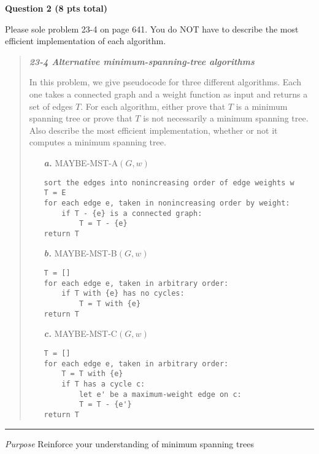\documentclass{article}
\newcommand\separator{\rule{\textwidth}{.2pt}}  %
\begin{document}
\begin{framed}
    \textbf{Question 2 (8 pts total)}
    
    Please sole problem 23-4 on page 641. You do NOT have to describe the most 
    efficient implementation of each algorithm.
    
    \begin{quote}
        \textbf{\textit{23-4 Alternative minimum-spanning-tree algorithms}} 
        
        In this problem, we give pseudocode for three different algorithms. Each
        one takes a connected graph and a weight function as input and returns a
        set of edges $T$. For each algorithm, either prove that $T$ is a minimum
        spanning tree or prove that $T$ is not necessarily a minimum spanning 
        tree. Also describe the most efficient implementation, whether or not it
        computes a minimum spanning tree. 
        
        \begin{enumerate}
            \item[\textbf{\textit{a.}}] MAYBE-MST-A$(G, w)$
\begin{verbatim}
sort the edges into nonincreasing order of edge weights w
T = E
for each edge e, taken in nonincreasing order by weight:
    if T - {e} is a connected graph:
        T = T - {e}
return T
\end{verbatim}
            \item[\textbf{\textit{b.}}] MAYBE-MST-B$(G, w)$
\begin{verbatim}
T = []
for each edge e, taken in arbitrary order:
    if T with {e} has no cycles:
        T = T with {e}
return T
\end{verbatim}            
            \item[\textbf{\textit{c.}}] MAYBE-MST-C$(G, w)$
\begin{verbatim}
T = []
for each edge e, taken in arbitrary order:
    T = T with {e}
    if T has a cycle c:
        let e' be a maximum-weight edge on c:
        T = T - {e'}
return T
\end{verbatim}
        \end{enumerate}
    \end{quote}

    \separator

    \textit{Purpose} Reinforce your understanding of minimum spanning trees
\end{framed}
\end{document}
